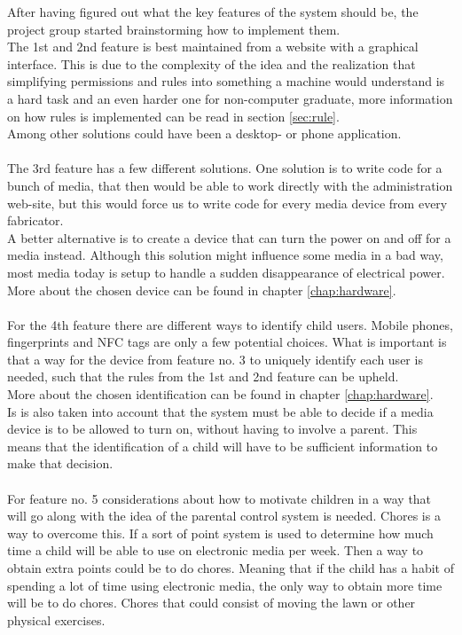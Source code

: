 After having figured out what the key features of the system should be, the project group started brainstorming how to implement them.\\
The 1st and 2nd feature is best maintained from a website with a graphical interface. This is due to the complexity of the idea and the realization that simplifying permissions and rules into something a machine would understand is a hard task and an even harder one for non-computer graduate, more information on how rules is implemented can be read in section \vref{sec:rule}.\\
Among other solutions could have been a desktop- or phone application.\\
\\
The 3rd feature has a few different solutions. One solution is to write code for a bunch of media, that then would be able to work directly with the administration web-site, but this would force us to write code for every media device from every fabricator.\\
A better alternative is to create a device that can turn the power on and off for a media instead. Although this solution might influence some media in a bad way, most media today is setup to handle a sudden disappearance of electrical power.\\
More about the chosen device can be found in chapter \vref{chap:hardware}.\\
\\
For the 4th feature there are different ways to identify child users. Mobile phones, fingerprints and NFC tags are only a few potential choices. What is important is that a way for the device from feature no. 3 to uniquely identify each user is needed, such that the rules from the 1st and 2nd feature can be upheld.\\
More about the chosen identification can be found in chapter \vref{chap:hardware}.\\
Is is also taken into account that the system must be able to decide if a media device is to be allowed to turn on, without having to involve a parent. This means that the identification of a child will have to be sufficient information to make that decision.\\
\\
For feature no. 5 considerations about how to motivate children in a way that will go along with the idea of the parental control system is needed. Chores is a way to overcome this. If a sort of point system is used to determine how much time a child will be able to use on electronic media per week. Then a way to obtain extra points could be to do chores. Meaning that if the child has a habit of spending a lot of time using electronic media, the only way to obtain more time will be to do chores. Chores that could consist of moving the lawn or other physical exercises.\\

